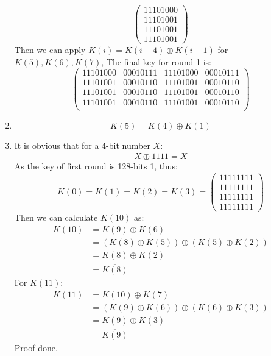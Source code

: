 \documentclass[12pt, a4paper]{article}
\begin{document}
\begin{enumerate}
$$          \begin{pmatrix} 11101000\\ 11101001\\ 11101001\\ 11101001 \end{pmatrix}$$
          Then we can apply $K(i) = K(i - 4) \oplus K(i - 1)$ for $K(5), K(6), K(7)$, 
          The final key for round 1 is:
          $$
          \begin{pmatrix}
                11101000 & 00010111 & 11101000 & 00010111\\
                11101001 & 00010110 & 11101001 & 00010110\\
                11101001 & 00010110 & 11101001 & 00010110\\
                11101001 & 00010110 & 11101001 & 00010110\\
          \end{pmatrix}
          $$
    \item $$K(5) = K(4) \oplus K(1)$$
    \item It is obvious that for a 4-bit number $X$:
          $$X \oplus 1111 = \overline{X}$$
          As the key of first round is 128-bits 1, thus:
          $$K(0) = K(1) = K(2) = K(3) = \begin{pmatrix} 11111111\\ 11111111\\ 11111111\\ 11111111\end{pmatrix}$$
          Then we can calculate $K(10)$ as:
          \begin{align*}
              K(10) &= K(9) \oplus K(6)\\
                    &= (K(8) \oplus K(5)) \oplus (K(5) \oplus K(2))\\
                    &= K(8) \oplus K(2)\\
                    &= \overline{K(8)}
          \end{align*}
          For $K(11)$:
          \begin{align*}
            K(11) &= K(10) \oplus K(7)\\
                  &= (K(9) \oplus K(6)) \oplus (K(6) \oplus K(3))\\
                  &= K(9) \oplus K(3)\\
                  &= \overline{K(9)}
        \end{align*}
        Proof done.
\end{enumerate}
\end{document}
